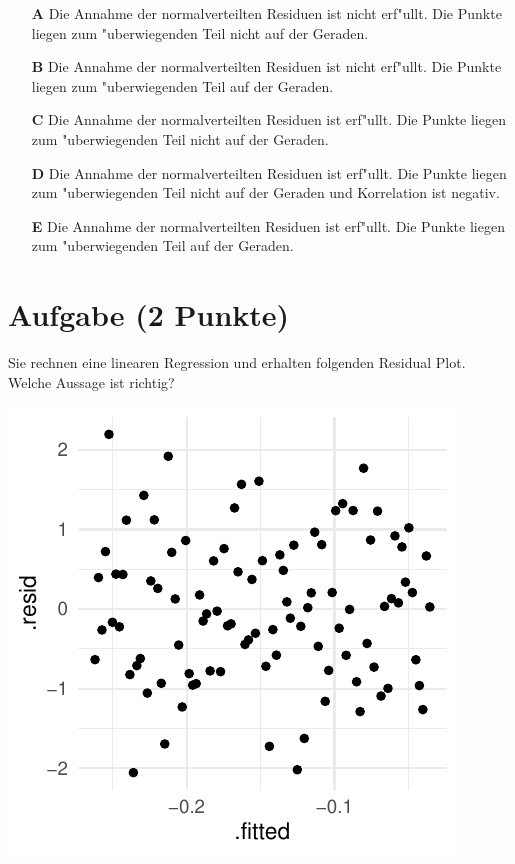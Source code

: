 \documentclass[a4paper, 10pt]{scrartcl}\usepackage[]{graphicx}\usepackage[]{xcolor}
\makeatletter
\def\maxwidth{ %
  \ifdim\Gin@nat@width>\linewidth
    \linewidth
  \else
    \Gin@nat@width
  \fi
}
\makeatother
\begin{document}
\begin{enumerate}
\item [\textbf{A} \msquare] Die Annahme der normalverteilten Residuen ist nicht erf{"u}llt. Die Punkte liegen zum {"u}berwiegenden Teil nicht auf der Geraden.
\item [\textbf{B} \msquare] Die Annahme der normalverteilten Residuen ist nicht erf{"u}llt. Die Punkte liegen zum {"u}berwiegenden Teil auf der Geraden.
\item [\textbf{C} \msquare] Die Annahme der normalverteilten Residuen ist erf{"u}llt. Die Punkte liegen zum {"u}berwiegenden Teil nicht auf der Geraden.
\item [\textbf{D} \msquare] Die Annahme der normalverteilten Residuen ist erf{"u}llt. Die Punkte liegen zum {"u}berwiegenden Teil nicht auf der Geraden und Korrelation ist negativ.
\item [\textbf{E} \msquare] Die Annahme der normalverteilten Residuen ist erf{"u}llt. Die Punkte liegen zum {"u}berwiegenden Teil auf der Geraden.
\end{enumerate}

\section{Aufgabe \hfill (2 Punkte)}

Sie rechnen eine linearen Regression und erhalten folgenden Residual
Plot. Welche Aussage ist richtig?




{\centering \includegraphics[width=\maxwidth]{img/mc-regression-06-a-1} 

}
\end{document}
